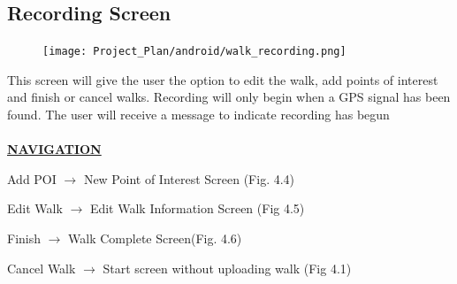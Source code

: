 \documentclass[12pt]{article}
\begin{document}
\subsection{Recording Screen}
\begin{figure}[htp]
\centering
\texttt{[image: Project\_Plan/android/walk\_recording.png]}
\caption{}
\label{}
\end{figure}
\par{This screen will give the user the option to edit the walk, add points of interest and finish or cancel walks. Recording will only begin when a GPS signal has been found. The user will receive a message to indicate recording has begun\\ \\}
\textbf{\uline{NAVIGATION}}
\par{Add POI $\rightarrow$ New Point of Interest Screen (Fig. 4.4)}
\par{Edit Walk $\rightarrow$ Edit Walk Information Screen (Fig 4.5)}
\par{Finish $\rightarrow$ Walk Complete Screen(Fig. 4.6)}
\par{Cancel Walk $\rightarrow$ Start screen without uploading walk (Fig 4.1)}
\end{document}
